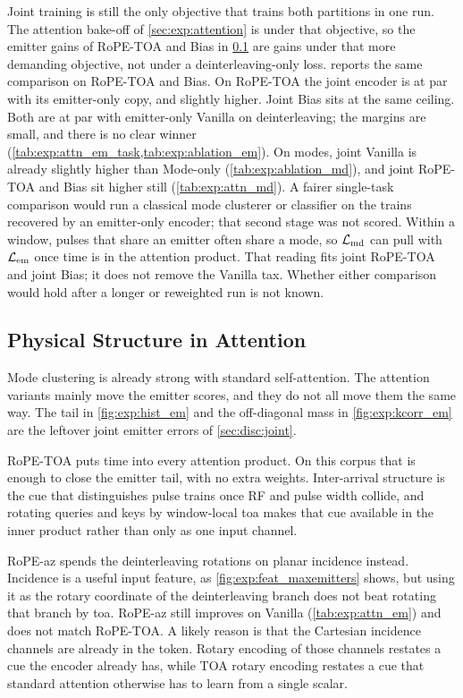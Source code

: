 Joint training is still the only objective that trains both partitions in one run.
The attention bake-off of \cref{sec:exp:attention} is under that objective, so the emitter gains of RoPE-TOA and Bias in \cref{sec:disc:attention} are gains under that more demanding objective, not under a deinterleaving-only loss.
 reports the same comparison on RoPE-TOA and Bias.
On RoPE-TOA the joint encoder is at par with its emitter-only copy, and slightly higher.
Joint Bias sits at the same ceiling.
Both are at par with emitter-only Vanilla on deinterleaving; the margins are small, and there is no clear winner (\cref{tab:exp:attn_em_task,tab:exp:ablation_em}).
On modes, joint Vanilla is already slightly higher than Mode-only (\cref{tab:exp:ablation_md}), and joint RoPE-TOA and Bias sit higher still (\cref{tab:exp:attn_md}).
A fairer single-task comparison would run a classical mode clusterer or classifier on the trains recovered by an emitter-only encoder; that second stage was not scored.
Within a window, pulses that share an emitter often share a mode, so $\mathcal{L}_{\mathrm{md}}$ can pull with $\mathcal{L}_{\mathrm{em}}$ once time is in the attention product.
That reading fits joint RoPE-TOA and joint Bias; it does not remove the Vanilla tax.
Whether either comparison would hold after a longer or reweighted run is not known.

\subsection{Physical Structure in Attention}\label{sec:disc:attention}

Mode clustering is already strong with standard self-attention.
The attention variants mainly move the emitter scores, and they do not all move them the same way.
The tail in \cref{fig:exp:hist_em} and the off-diagonal mass in \cref{fig:exp:kcorr_em} are the leftover joint emitter errors of \cref{sec:disc:joint}.

RoPE-TOA puts time into every attention product.
On this corpus that is enough to close the emitter tail, with no extra weights.
Inter-arrival structure is the cue that distinguishes pulse trains once RF and pulse width collide, and rotating queries and keys by window-local \gls{toa} makes that cue available in the inner product rather than only as one input channel.

RoPE-az spends the deinterleaving rotations on planar incidence instead.
Incidence is a useful input feature, as \cref{fig:exp:feat_maxemitters} shows, but using it as the rotary coordinate of the deinterleaving branch does not beat rotating that branch by \gls{toa}.
RoPE-az still improves on Vanilla (\cref{tab:exp:attn_em}) and does not match RoPE-TOA.
A likely reason is that the Cartesian incidence channels are already in the token. Rotary encoding of those channels restates a cue the encoder already has, while TOA rotary encoding restates a cue that standard attention otherwise has to learn from a single scalar.

